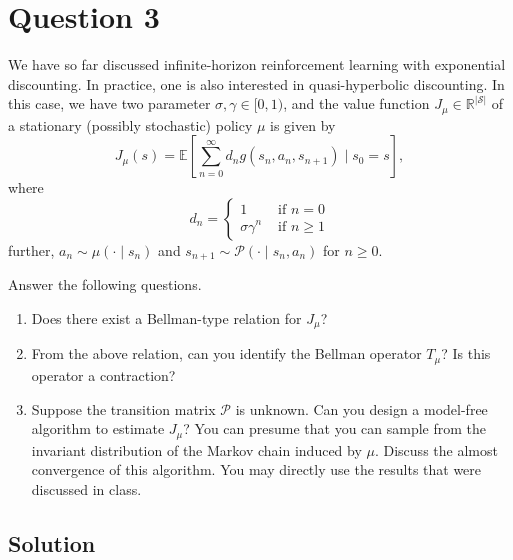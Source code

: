 \section*{Question 3}

We have so far discussed infinite-horizon reinforcement learning with exponential discounting.
In practice, one is also interested in quasi-hyperbolic discounting.
In this case, we have two parameter \( \sigma, \gamma \in [0,1) \), and the value function \( J_{\mu} \in \mathbb{R}^{|\mathcal{S}|} \) of a stationary (possibly stochastic) policy \( \mu \) is given by
\[
    J_{\mu}(s)=\mathbb{E}\left[\sum_{n=0}^{\infty} d_{n} g\left(s_{n}, a_{n}, s_{n+1}\right) \mid s_{0}=s\right],
\]
where
\[
    d_{n}= \begin{cases}1 & \text { if } n=0 \\ \sigma \gamma^{n} & \text { if } n \geq 1\end{cases}
\]
further, \( a_{n} \sim \mu\left(\cdot \mid s_{n}\right) \) and \( s_{n+1} \sim \mathcal{P}\left(\cdot \mid s_{n}, a_{n}\right) \) for \( n \geq 0 \).

Answer the following questions.
\begin{enumerate}[label= (\alph*), noitemsep]
    \item Does there exist a Bellman-type relation for \( J_{\mu} \)?
    \item From the above relation, can you identify the Bellman operator \( T_{\mu} \)?
          Is this operator a contraction?
    \item Suppose the transition matrix \( \mathcal{P} \) is unknown.
          Can you design a model-free algorithm to estimate \( J_{\mu} \)?
          You can presume that you can sample from the invariant distribution of the Markov chain induced by \( \mu \).
          Discuss the almost convergence of this algorithm.
          You may directly use the results that were discussed in class.
\end{enumerate}

\subsection*{Solution}
